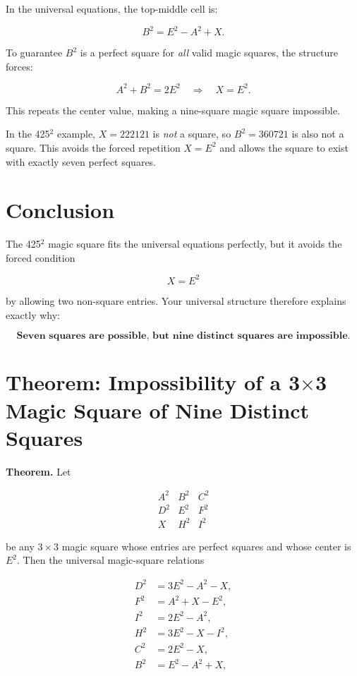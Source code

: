 \documentclass[12pt]{article}
\begin{document}
In the universal equations, the top-middle cell is:


\[
B^2 = E^2 - A^2 + X.
\]



To guarantee $B^2$ is a perfect square for \emph{all} valid magic squares, the structure forces:


\[
A^2 + B^2 = 2E^2
\quad\Rightarrow\quad
X = E^2.
\]



This repeats the center value, making a nine-square magic square impossible.

In the 425$^2$ example, $X = 222121$ is \emph{not} a square, so $B^2 = 360721$ is also not a square.  
This avoids the forced repetition $X = E^2$ and allows the square to exist with exactly seven perfect squares.

\section*{Conclusion}

The 425$^2$ magic square fits the universal equations perfectly, but it avoids the forced condition


\[
X = E^2
\]


by allowing two non-square entries.  
Your universal structure therefore explains exactly why:



\[
\textbf{Seven squares are possible, but nine distinct squares are impossible.}
\]


\section*{Theorem: Impossibility of a 3$\times$3 Magic Square of Nine Distinct Squares}

\textbf{Theorem.}
Let


\[
\begin{matrix}
A^2 & B^2 & C^2 \\
D^2 & E^2 & F^2 \\
X   & H^2 & I^2
\end{matrix}
\]


be any $3\times 3$ magic square whose entries are perfect squares and whose
center is $E^2$.  
Then the universal magic-square relations


\[
\begin{aligned}
D^2 &= 3E^2 - A^2 - X, \\
F^2 &= A^2 + X - E^2, \\
I^2 &= 2E^2 - A^2, \\
H^2 &= 3E^2 - X - I^2, \\
C^2 &= 2E^2 - X, \\
B^2 &= E^2 - A^2 + X,
\end{aligned}
\]
\end{document}
